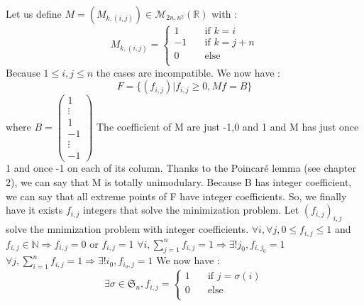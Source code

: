 \documentclass{article}
\begin{document}
	Let us define $M = (M_{k,(i,j)}) \in \mathcal{M}_{2n,n^2}(\mathbb{R})$ with :\newline
	\[
   		M_{k,(i,j)} =  \begin{cases}
        1  & \quad \text{if } k=i \\
    	-1 & \quad \text{if } k=j+n\\
    	0 & \quad \text{else}\\
  	\end{cases}
  	\]
	Because $1\leq i,j \leq n$ the cases are incompatible.\newline
	\newline
	We now have :\newline
	\begin{equation*}
	F = \{(f_{i,j})| f_{i,j}\geq 0, Mf = B \}
	\end{equation*}
	where $B = 
 	\begin{pmatrix}
 	 1  \\
 	 \vdots \\
  	1 \\
  	-1 \\
  	\vdots  \\
  	-1 
 	\end{pmatrix}$\newline
 	\newline
 	The coefficient of M are just -1,0 and 1 and 
	M has just once 1 and once -1 on each of its column. \newline
	Thanks to the Poincaré lemma (see \cite{gaubert} chapter 2), we can say that M is totally unimodulary. Because B has integer coefficient, we can say that all extreme points of F have integer coefficients.\newline
	So, we finally have it exists $f_{i,j}$ integers that solve the minimization problem.\newline
	\newline
	Let $(f_{i,j})_{i,j}$ solve the mnimization problem with integer coefficients.\newline
	$\forall i, \forall j, 0\leq f_{i,j} \leq 1$ and $f_{i,j}\in \mathbb{N} \Rightarrow f_{i,j} =0$ or $ f_{i,j} =1$ \newline
	$\forall i, \sum\limits_{j=1}^n f_{i,j} = 1 \Rightarrow \exists ! j_0,  f_{i,j_0} =1$\newline
	$\forall j, \sum\limits_{i=1}^n f_{i,j} = 1 \Rightarrow \exists ! i_0,  f_{i_0,j} =1$\newline
	\newline
	We now have :
	\begin{equation*}
	\exists \sigma \in \mathfrak{S}_n, f_{i,j} =  \begin{cases}
        1  & \quad \text{if } j=\sigma(i) \\
    	0 & \quad \text{else}\\
  	\end{cases}
	\end{equation*}
\end{document}
